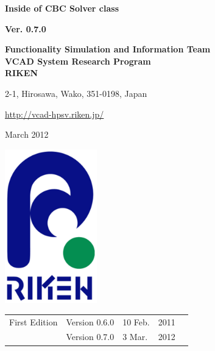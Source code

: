 \documentclass[a4paper,10pt,oneside,fleqn]{jsbook}
\begin{document}
\begin{titlepage}
\begin{center}
\vspace*{3cm}
{\huge \textbf{Inside of CBC Solver class}}\\
\vspace{1cm}

{\large \textbf{Ver. 0.7.0}}\\
\vspace{1.5cm}

{\large \textbf{Functionality Simulation and Information Team}\\
\large \textbf{VCAD System Research Program}\\
\large \textbf{RIKEN}\\
\vspace{1cm}
}

{\large 2-1, Hirosawa, Wako, 351-0198, Japan}\\
\vspace{0.5cm}

\url{http://vcad-hpsv.riken.jp/}\\
\vspace{1cm}

March 2012\\
\vspace{4cm}

\includegraphics[width=4cm,bb=-80 0 220 500]{RIKEN_logo_300x500.eps}

\end{center}
\end{titlepage}
\newpage

%
\frontmatter

\begin{tabular}{llllr}
First Edition  &  Version 0.6.0  & 10 Feb.  & 2011\\
               &  Version 0.7.0  &  3 Mar.  & 2012



\end{tabular}
\end{document}
